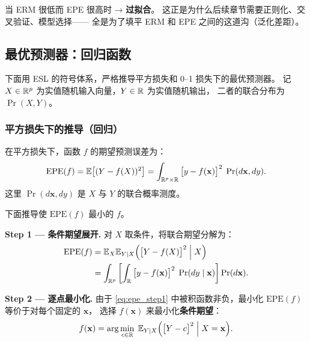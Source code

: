 当 ERM 很低而 EPE 很高时 → \textbf{过拟合}。
这正是为什么后续章节需要正则化、交叉验证、模型选择——
全是为了填平 ERM 和 EPE 之间的这道沟（泛化差距）。

\subsection{最优预测器：回归函数}

下面用 ESL 的符号体系，严格推导平方损失和 0--1 损失下的最优预测器。
记 $X \in \mathbb{R}^p$ 为实值随机输入向量，$Y \in \mathbb{R}$ 为实值随机输出，
二者的联合分布为 $\Pr(X, Y)$。

\subsubsection{平方损失下的推导（回归）}

\begin{definition}
在平方损失下，函数 $f$ 的期望预测误差为：
\begin{equation}\label{eq:epe_sq}
    \mathrm{EPE}(f)
    = \mathbb{E}\big[(Y - f(X))^2\big]
    = \int_{\mathbb{R}^p \times \mathbb{R}} \big[y - f(\mathbf{x})\big]^2 \; \Pr(d\mathbf{x}, dy).
\end{equation}
这里 $\Pr(d\mathbf{x}, dy)$ 是 $X$ 与 $Y$ 的联合概率测度。
\end{definition}

下面推导使 $\mathrm{EPE}(f)$ 最小的 $f$。

\textbf{Step 1 --- 条件期望展开.}
对 $X$ 取条件，将联合期望分解为：
\begin{align}
    \mathrm{EPE}(f)
    &= \mathbb{E}_X \mathbb{E}_{Y \mid X}\Big( \big[Y - f(X)\big]^2 \;\Big|\; X \Big) \label{eq:epe_step1} \\
    &= \int_{\mathbb{R}^p} \left[ \int_{\mathbb{R}} \big[y - f(\mathbf{x})\big]^2 \; \Pr(dy \mid \mathbf{x}) \right] \Pr(d\mathbf{x}). \nonumber
\end{align}

\textbf{Step 2 --- 逐点最小化.}
由于 \eqref{eq:epe_step1} 中被积函数非负，最小化 $\mathrm{EPE}(f)$ 等价于对每个固定的 $\mathbf{x}$，
选择 $f(\mathbf{x})$ 来最小化\textbf{条件期望}：
\begin{equation}\label{eq:epe_pointwise}
    f(\mathbf{x}) = \arg\min_{c \in \mathbb{R}} \; \mathbb{E}_{Y \mid X}\Big( \big[Y - c\big]^2 \;\Big|\; X = \mathbf{x} \Big).
\end{equation}

